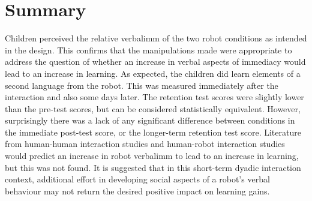 \section{Summary} \label{sec:verbal-summary}
Children perceived the relative \gls{verbalimm} of the two robot conditions as intended in the design. This confirms that the manipulations made were appropriate to address the question of whether an increase in verbal aspects of immediacy would lead to an increase in \gls{learning}. As expected, the children did learn elements of a second language from the robot. This was measured immediately after the interaction and also some days later. The retention test scores were slightly lower than the pre-test scores, but can be considered statistically equivalent. However, surprisingly there was a lack of any significant difference between conditions in the immediate post-test score, or the longer-term retention test score. Literature from human-human interaction studies \citep{gorham1988relationship,witt2004meta} and human-robot interaction studies \citep{henkemans2013using,kruijff2014oat} would predict an increase in robot \gls{verbalimm} to lead to an increase in \gls{learning}, but this was not found. It is suggested that in this short-term dyadic interaction context, additional effort in developing social aspects of a robot's verbal behaviour may not return the desired positive impact on \gls{learning} gains.